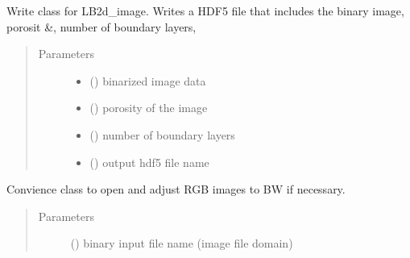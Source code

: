 \documentclass[letterpaper,10pt,english]{sphinxmanual}
\begin{document}

\begin{fulllineitems}
\label{\detokenize{index:lb_colloids.LB.LB_2Dimage.HDF5_write}}
Write class for LB2d\_image. Writes a HDF5 file that includes
the binary image, porosit \&, number of boundary layers,
\begin{quote}\begin{description}
\item[{Parameters}] \leavevmode\begin{itemize}
\item {} 
 () \textendash{} binarized image data

\item {} 
 () \textendash{} porosity of the image

\item {} 
 () \textendash{} number of boundary layers

\item {} 
 () \textendash{} output hdf5 file name

\end{itemize}

\end{description}\end{quote}

\end{fulllineitems}


\begin{fulllineitems}
\label{\detokenize{index:lb_colloids.LB.LB_2Dimage.Images}}
Convience class to open and adjust RGB images to BW if
necessary.
\begin{quote}\begin{description}
\item[{Parameters}] \leavevmode
{} () \textendash{} binary input file name (image file domain)

\end{description}\end{quote}

\end{fulllineitems}
\end{document}
